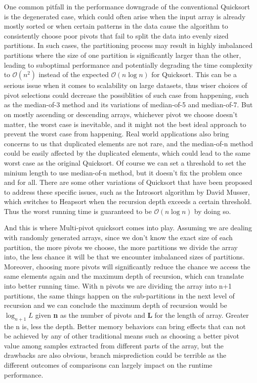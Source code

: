 \documentclass{article}
\newcommand{\bigO}{\mathcal{O}}
\begin{document}
One common pitfall in the performance downgrade of the conventional Quicksort is the degenerated case,
which could often arise when the input array is already mostly sorted or when certain patterns in the data cause the algorithm to consistently choose poor pivots
that fail to split the data into evenly sized partitions. 
In such cases, the partitioning process may result in highly imbalanced partitions where the size of one partition is significantly larger than the other, leading to suboptimal performance and
potentially degrading the time complexity to $\bigO(n^2)$ instead of the expected $\bigO(n\log n)$ for Quicksort. This can be a serious issue when it comes to scalability on large datasets, thus
wiser choices of pivot selections could decrease the possiblities of such case from happening, such as the median-of-3 method and its variations of median-of-5 and median-of-7.
But on mostly ascending or descending arrays, whichever pivot we choose doesn't matter, the worst case is inevitable,
and it might not the best ideal approach to prevent the worst case from happening. Real world applications also bring concerns to us that duplicated elements are not rare,
and the median-of-n method could be easily affected by the duplicated elements, which could lead to the same worst case as the original Quicksort.
Of course we can set a threshold to set the minium length to use median-of-n method, but it doesn't fix the problem once and for all.
There are some other variations of Quicksort that have been proposed to address these specific issues, such as the Introsort algorithm \cite{Introsort} by David Musser,
which switches to Heapsort when the recursion depth exceeds a certain threshold. Thus the worst running time is guaranteed to be $\bigO(n\log n)$ by doing so.

And this is where Multi-pivot quicksort comes into play. Assuming we are dealing with randomly generated arrays,
since we don't know the exact size of each partition, the more pivots we choose, the more partitions we divide the array into,
the less chance it will be that we encounter imbalanced sizes of partitions. 
Moreover, choosing more pivots will significantly reduce the chance we access the same elements again and the maximum depth of recursion,
which can translate into better running time. With n pivots we are dividing the array into n+1 partitions, the same things happen on the sub-partitions 
in the next level of recursion and we can conclude the maximum depth of recursion would be $\log_{n+1} L$ given \textbf{n} as the number of pivots and \textbf{L} for the length of array.
Greater the n is, less the depth. Better memory behaviors can bring effects that can not be achieved by any of other traditional means such as choosing a better pivot value
among samples extracted from different parts of the array, but the drawbacks are also obvious, 
branch misprediction could be terrible as the different outcomes of comparisons can largely impact on the runtime performance.
\end{document}
